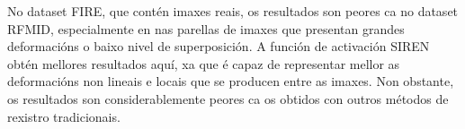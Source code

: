 No dataset FIRE, que contén imaxes reais, os resultados son peores ca no dataset RFMID, especialmente en nas parellas de imaxes que presentan grandes deformacións o baixo nivel de superposición.
A función de activación SIREN obtén mellores resultados aquí, xa que é capaz de representar mellor as deformacións non lineais e locais que se producen entre as imaxes.
Non obstante, os resultados son considerablemente peores ca os obtidos con outros métodos de rexistro tradicionais.

